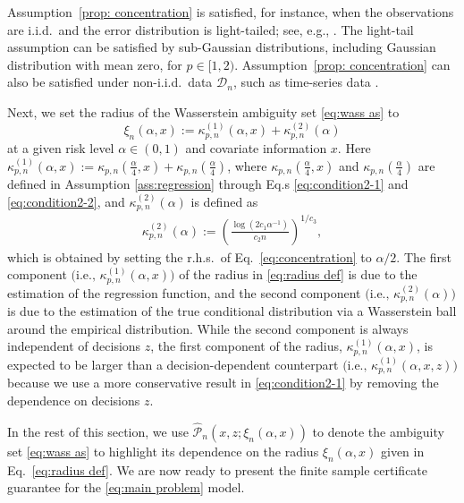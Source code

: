 \documentclass[onefignum,onetabnum]{siamart251216}
\begin{document}
Assumption\ \ref{prop: concentration} is satisfied, for instance, when the observations are i.i.d.\ and the error distribution is light-tailed; see, e.g., \citep[][Theorem 2]{fournier2015rate}.  The light-tail assumption can be satisfied by sub-Gaussian distributions, including Gaussian distribution with mean zero, for $p\in[1,2)$. Assumption\ \ref{prop: concentration} can also be satisfied under non-i.i.d.\ data $\mathcal{D}_n$, such as time-series data \cite{dou2019distributionally}. 


Next, we set the radius of the Wasserstein ambiguity set \eqref{eq:wass as} to
\begin{equation}\label{eq:radius def}
    \xi_n(\alpha,x) := \kappa_{p,n}^{(1)}(\alpha,x) + \kappa_{p,n}^{(2)}(\alpha)
\end{equation}
at a given risk level $\alpha\in(0,1)$ and covariate information $x$. Here $\kappa_{p,n}^{(1)}(\alpha,x):= \kappa_{p,n}(\frac{\alpha}{4},x) + \kappa_{p,n}(\frac{\alpha}{4})$, where $\kappa_{p,n}(\frac{\alpha}{4},x)$ and $\kappa_{p,n}(\frac{\alpha}{4})$ are defined in Assumption \ref{ass:regression} through Eq.s \eqref{eq:condition2-1} and \eqref{eq:condition2-2}, and $\kappa_{p,n}^{(2)}(\alpha)$ is defined as 
\begin{align}\label{kappa2}
\kappa_{p,n}^{(2)}(\alpha):= \left(\frac{\log(2c_1 \alpha^{-1})}{c_2n}\right)^{1/c_3},  
\end{align}
which is obtained by setting the r.h.s.\ of Eq.~\eqref{eq:concentration} to $\alpha/2$. The first component $\big(\text{i.e., }\kappa_{p,n}^{(1)}(\alpha,x)\big)$ of the radius in \eqref{eq:radius def} is due to the estimation of the regression function, and the second component $\big(\text{i.e., }\kappa_{p,n}^{(2)}(\alpha)\big)$ is due to the estimation of the true conditional distribution via a Wasserstein ball around the empirical distribution. While the second component is always independent of decisions $z$, the first component of the radius, $\kappa_{p,n}^{(1)}(\alpha,x)$, is expected to be larger than a decision-dependent counterpart $\big(\text{i.e., }\kappa_{p,n}^{(1)}(\alpha,x,z)\big)$ because we use a more conservative result in \eqref{eq:condition2-1} by removing the dependence on decisions $z$. 

In the rest of this section, we use $\hat{\mathcal{P}}_n(x,z;\xi_n(\alpha,x))$ to denote the ambiguity set \eqref{eq:wass as} to highlight its dependence on the radius $\xi_n(\alpha,x)$ given in Eq.~\eqref{eq:radius def}. We are now ready to present the finite sample certificate guarantee for the \eqref{eq:main problem} model.
\end{document}
